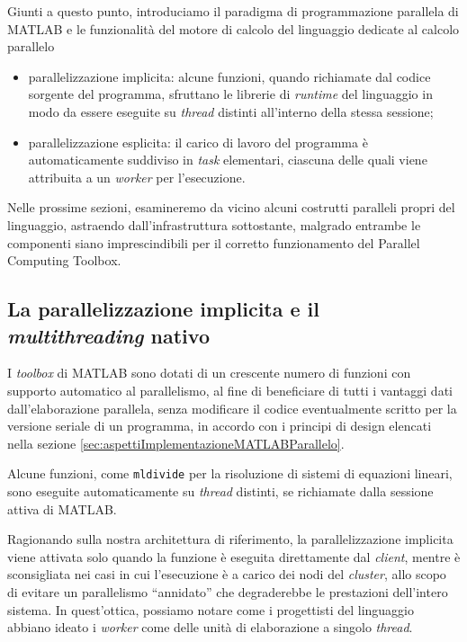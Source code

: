Giunti a questo punto, introduciamo il paradigma di programmazione parallela di MATLAB e le funzionalit\`a del motore di calcolo del linguaggio dedicate al calcolo parallelo
\begin{itemize}
    \item parallelizzazione implicita: alcune funzioni, quando richiamate dal codice sorgente del programma, sfruttano le librerie di \textit{runtime} del linguaggio
          in modo da essere eseguite su \textit{thread} distinti all'interno della stessa sessione;
    \item parallelizzazione esplicita: il carico di lavoro del programma \`e automaticamente suddiviso in \textit{task} elementari, ciascuna delle quali viene
          attribuita a un \textit{worker} per l'esecuzione.
\end{itemize}

Nelle prossime sezioni, esamineremo da vicino alcuni costrutti paralleli propri del linguaggio, astraendo dall'infrastruttura sottostante, malgrado entrambe le componenti
siano imprescindibili per il corretto funzionamento del Parallel Computing Toolbox.

\subsection{La parallelizzazione implicita e il \textit{multithreading} nativo}
I \textit{toolbox} di MATLAB sono dotati di un crescente numero di funzioni con supporto automatico al parallelismo, al fine di beneficiare di tutti
i vantaggi dati dall'elaborazione parallela, senza modificare il codice eventualmente scritto per la versione seriale di un programma, in accordo con i principi di design elencati
nella sezione \ref{sec:aspettiImplementazioneMATLABParallelo}.

Alcune funzioni, come \lstinline{mldivide} per la risoluzione di sistemi di equazioni lineari, sono eseguite automaticamente su \textit{thread}
distinti, se richiamate dalla sessione attiva di MATLAB.

Ragionando sulla nostra architettura di riferimento, la parallelizzazione implicita viene attivata solo quando la funzione \`e eseguita direttamente dal \textit{client},
mentre \`e sconsigliata nei casi in cui l'esecuzione \`e a carico dei nodi del \textit{cluster}, allo scopo di evitare un parallelismo \enquote{annidato} che degraderebbe le prestazioni
dell'intero sistema. \newline
In quest'ottica, possiamo notare come i progettisti del linguaggio abbiano ideato i \textit{worker} come delle unit\`a di elaborazione a singolo \textit{thread}.

